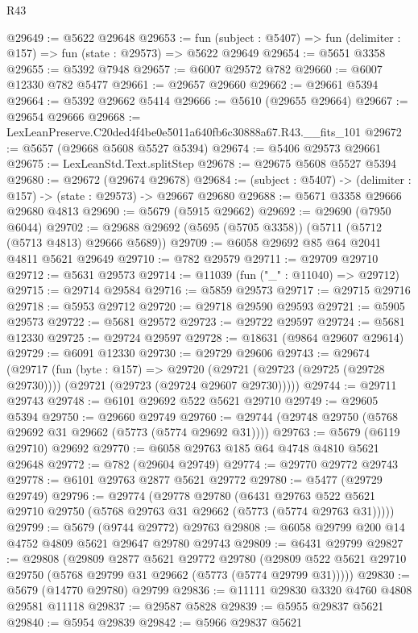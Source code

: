\begin{lexlean}{R43}
\begin{coremodule}
@29649 := @5622 @29648
@29653 := fun (subject : @5407) => fun (delimiter : @157) => fun (state : @29573) => @5622 @29649
@29654 := @5651 @3358
@29655 := @5392 @7948
@29657 := @6007 @29572 @782
@29660 := @6007 @12330 @782 @5477
@29661 := @29657 @29660
@29662 := @29661 @5394
@29664 := @5392 @29662 @5414
@29666 := @5610 (@29655 @29664)
@29667 := @29654 @29666
@29668 := LexLeanPreserve.C20ded4f4be0e5011a640fb6c30888a67.R43.__fits_101
@29672 := @5657 (@29668 @5608 @5527 @5394)
@29674 := @5406 @29573 @29661
@29675 := LexLeanStd.Text.splitStep
@29678 := @29675 @5608 @5527 @5394
@29680 := @29672 (@29674 @29678)
@29684 := (subject : @5407) -> (delimiter : @157) -> (state : @29573) -> @29667 @29680
@29688 := @5671 @3358 @29666 @29680 @4813
@29690 := @5679 (@5915 @29662)
@29692 := @29690 (@7950 @6044)
@29702 := @29688 @29692 (@5695 (@5705 @3358)) (@5711 (@5712 (@5713 @4813) @29666 @5689))
@29709 := @6058 @29692 @85 @64 @2041 @4811 @5621 @29649
@29710 := @782 @29579
@29711 := @29709 @29710
@29712 := @5631 @29573
@29714 := @11039 (fun ("_" : @11040) => @29712)
@29715 := @29714 @29584
@29716 := @5859 @29573
@29717 := @29715 @29716
@29718 := @5953 @29712
@29720 := @29718 @29590 @29593
@29721 := @5905 @29573
@29722 := @5681 @29572
@29723 := @29722 @29597
@29724 := @5681 @12330
@29725 := @29724 @29597
@29728 := @18631 (@9864 @29607 @29614)
@29729 := @6091 @12330
@29730 := @29729 @29606
@29743 := @29674
    (@29717
      (fun (byte : @157) =>
      @29720 (@29721 (@29723 (@29725 (@29728 @29730)))) (@29721 (@29723 (@29724 @29607 @29730)))))
@29744 := @29711 @29743
@29748 := @6101 @29692 @522 @5621 @29710
@29749 := @29605 @5394
@29750 := @29660 @29749
@29760 := @29744 (@29748 @29750 (@5768 @29692 @31 @29662 (@5773 (@5774 @29692 @31))))
@29763 := @5679 (@6119 @29710) @29692
@29770 := @6058 @29763 @185 @64 @4748 @4810 @5621 @29648
@29772 := @782 (@29604 @29749)
@29774 := @29770 @29772 @29743
@29778 := @6101 @29763 @2877 @5621 @29772
@29780 := @5477 (@29729 @29749)
@29796 := @29774
    (@29778
      @29780
      (@6431 @29763 @522 @5621 @29710 @29750 (@5768 @29763 @31 @29662 (@5773 (@5774 @29763 @31)))))
@29799 := @5679 (@9744 @29772) @29763
@29808 := @6058 @29799 @200 @14 @4752 @4809 @5621 @29647 @29780 @29743
@29809 := @6431 @29799
@29827 := @29808
    (@29809
      @2877
      @5621
      @29772
      @29780
      (@29809 @522 @5621 @29710 @29750 (@5768 @29799 @31 @29662 (@5773 (@5774 @29799 @31)))))
@29830 := @5679 (@14770 @29780) @29799
@29836 := @11111 @29830 @3320 @4760 @4808 @29581 @11118
@29837 := @29587 @5828
@29839 := @5955 @29837 @5621
@29840 := @5954 @29839
@29842 := @5966 @29837 @5621

\end{coremodule}
\end{lexlean}
